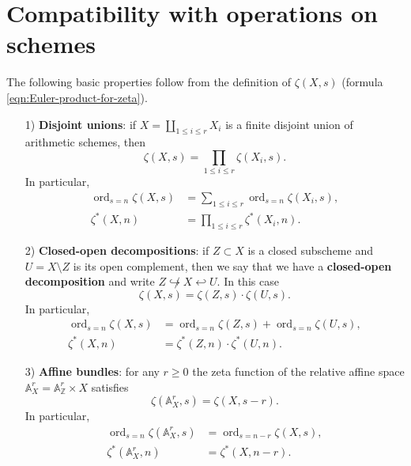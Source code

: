 \documentclass[10pt,a4paper,oneside,draft]{article}
\DeclareMathOperator{\ord}{ord}
\newcommand{\ZZ}{\mathbb{Z}}
\renewcommand{\AA}{\mathbb{A}}
\theoremstyle{myplain}
\theoremstyle{mydefinition}
\numberwithin{equation}{section}
\begin{document}

\section{Compatibility with operations on schemes}
\label{sec:compatibility-with-operations}

The following basic properties follow from the definition of $\zeta (X,s)$
(formula \eqref{eqn:Euler-product-for-zeta}).

\begin{enumerate}
\item[1)] \textbf{Disjoint unions}: if $X = \coprod_{1 \le i \le r} X_i$ is a
  finite disjoint union of arithmetic schemes, then
  \begin{equation}
    \label{eqn:zeta-function-for-disjoint-unions}
    \zeta (X,s) = \prod_{1 \le i \le r} \zeta (X_i,s).
  \end{equation}
  In particular,
  \begin{align*}
    \ord_{s=n} \zeta (X,s) & = \sum_{1 \le i \le r} \ord_{s=n} \zeta (X_i,s), \\
    \zeta^* (X,n) & = \prod_{1 \le i \le r} \zeta^* (X_i,n).
  \end{align*}

\item[2)] \textbf{Closed-open decompositions}: if $Z \subset X$ is a closed
  subscheme and $U = X\setminus Z$ is its open complement, then we say that we
  have a \textbf{closed-open decomposition} and write
  $Z \not\hookrightarrow X \hookleftarrow U$. In this case
  \begin{equation}
    \label{eqn:zeta-function-for-closed-open-decompositions}
    \zeta (X,s) = \zeta (Z,s) \cdot \zeta (U,s).
  \end{equation}
  In particular,
  \begin{align*}
    \ord_{s=n} \zeta (X,s) & = \ord_{s=n} \zeta (Z,s) + \ord_{s=n} \zeta (U,s), \\
    \zeta^* (X,n) & = \zeta^* (Z,n) \cdot \zeta^* (U,n).
  \end{align*}

\item[3)] \textbf{Affine bundles}: for any $r \ge 0$ the zeta function of the
  relative affine space $\AA^r_X = \AA^r_\ZZ \times X$ satisfies
  \begin{equation}
    \label{eqn:zeta-function-for-affine-space}
    \zeta (\AA^r_X, s) = \zeta (X, s-r).
  \end{equation}
  In particular,
  \begin{align*}
    \ord_{s=n} \zeta (\AA^r_X, s) & = \ord_{s=n-r} \zeta (X, s), \\
    \zeta^* (\AA^r_X, n) & = \zeta^* (X, n-r).
  \end{align*}
\end{enumerate}
\end{document}
